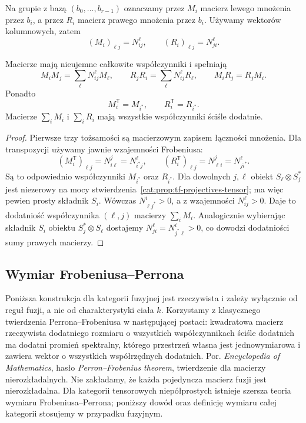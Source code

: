 \begin{definicja}\label{cat:def:tf-fusion-matrices}
Na grupie z bazą $(b_0,\ldots,b_{r-1})$ oznaczamy przez $M_i$ macierz lewego mnożenia przez $b_i$, a przez $R_i$ macierz prawego mnożenia przez $b_i$. Używamy wektorów kolumnowych, zatem
\[
 (M_i)_{\ell j}=N_{ij}^{\ell},\qquad
 (R_i)_{\ell j}=N_{ji}^{\ell}.
\]
\end{definicja}
\begin{stwierdzenie}\label{cat:prop:tf-fusion-matrices}
Macierze mają nieujemne całkowite współczynniki i spełniają
\[
 M_iM_j=\sum_\ell N_{ij}^{\ell}M_\ell,\qquad
 R_jR_i=\sum_\ell N_{ij}^{\ell}R_\ell,\qquad
 M_iR_j=R_jM_i.
\]
Ponadto
\[
 M_i^{\mathsf T}=M_{i^*},\qquad R_i^{\mathsf T}=R_{i^*}.
\]
Macierze $\sum_iM_i$ i $\sum_iR_i$ mają wszystkie współczynniki ściśle dodatnie.
\end{stwierdzenie}
\begin{proof}
Pierwsze trzy tożsamości są macierzowym zapisem łączności mnożenia. Dla transpozycji używamy jawnie wzajemności Frobeniusa:
\[
 (M_i^{\mathsf T})_{\ell j}=N_{i\ell}^{j}=N_{i^*j}^{\ell},
 \qquad
 (R_i^{\mathsf T})_{\ell j}=N_{\ell i}^{j}=N_{ji^*}^{\ell}.
\]
Są to odpowiednio współczynniki $M_{i^*}$ oraz $R_{i^*}$. Dla dowolnych $j,\ell$ obiekt $S_\ell\otimes S_j^*$ jest niezerowy na mocy stwierdzenia~\ref{cat:prop:tf-projectives-tensor}; ma więc pewien prosty składnik $S_i$. Wówczas $N_{\ell j^*}^{i}>0$, a z wzajemności $N_{ij}^{\ell}>0$. Daje to dodatniość współczynnika $(\ell,j)$ macierzy $\sum_i M_i$. Analogicznie wybierając składnik $S_i$ obiektu $S_j^*\otimes S_\ell$ dostajemy $N_{ji}^{\ell}=N_{j^*\ell}^{i}>0$, co dowodzi dodatniości sumy prawych macierzy.
\end{proof}

\subsection{Wymiar Frobeniusa--Perrona}

Poniższa konstrukcja dla kategorii fuzyjnej jest rzeczywista i zależy wyłącznie od reguł fuzji, a nie od charakterystyki ciała $k$. Korzystamy z klasycznego twierdzenia Perrona--Frobeniusa w następującej postaci: kwadratowa macierz rzeczywista dodatniego rozmiaru o wszystkich współczynnikach ściśle dodatnich ma dodatni promień spektralny, którego przestrzeń własna jest jednowymiarowa i zawiera wektor o wszystkich współrzędnych dodatnich. Por. \emph{Encyclopedia of Mathematics}, hasło \emph{Perron--Frobenius theorem}, twierdzenie dla macierzy nierozkładalnych. Nie zakładamy, że każda pojedyncza macierz fuzji jest nierozkładalna. Dla kategorii tensorowych niepółprostych istnieje szersza teoria wymiaru Frobeniusa--Perrona; poniższy dowód oraz definicję wymiaru całej kategorii stosujemy w przypadku fuzyjnym.

